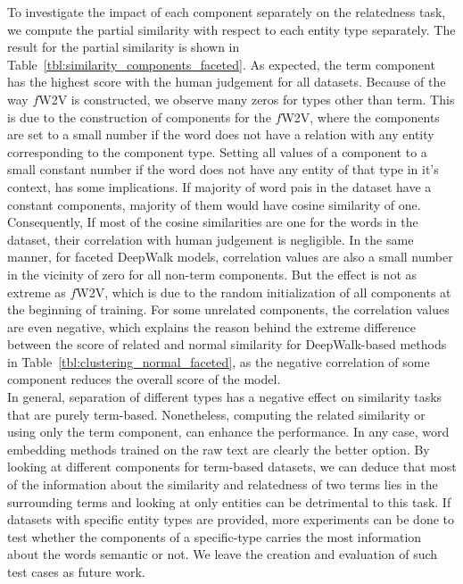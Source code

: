 To investigate the impact of each component separately on the relatedness task, we compute the partial similarity with respect to each entity type separately. The result for the partial similarity is shown in Table~\ref{tbl:similarity_components_faceted}. As expected, the term component has the highest score with the human judgement for all datasets. Because of the way $f$W2V is constructed, we observe many zeros for types other than term. This is due to the construction of components for the $f$W2V, where the components are set to a small number if the word does not have a relation with any entity corresponding to the component type. Setting all values of a component to a small constant number if the word does not have any entity of that type in it's context, has some implications. If majority of  word pais in the dataset have a constant components, majority of them would have cosine similarity of one. Consequently, If most of the cosine similarities are one for the words in the dataset, their correlation with human judgement is negligible. In the same manner, for faceted DeepWalk models, correlation values are also a small number in the vicinity of zero for all non-term components. But the effect is not as extreme as $f$W2V, which is due to the random initialization of all components at the beginning of training. For some unrelated components, the correlation values are even negative, which explains the reason behind the extreme difference between the score of related and normal similarity for DeepWalk-based methods in Table~\ref{tbl:clustering_normal_faceted}, as the negative correlation of some component reduces the overall score of the model. \\
In general, separation of different types has a negative effect on similarity tasks that are purely term-based. Nonetheless, computing the related similarity or using only the term component, can enhance the performance. In any case, word embedding methods trained on the raw text are clearly the better option. By looking at different components for term-based datasets, we can deduce that most of the information about the similarity and relatedness of two terms lies in the surrounding terms and looking at only entities can be detrimental to this task. If datasets with specific entity types are provided, more experiments can be done to test whether the components of a specific-type carries the most information about the words semantic or not. We leave the creation and evaluation of such test cases as future work. \\ 
